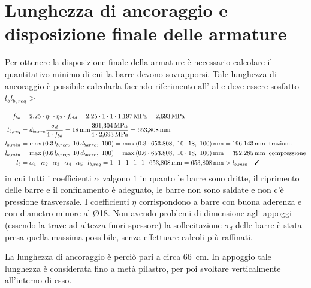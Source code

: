 \section{Lunghezza di ancoraggio e disposizione finale delle armature}
Per ottenere la disposizione finale della armature è necessario calcolare il quantitativo minimo di cui la barre devono sovrapporsi.
Tale lunghezza di ancoraggio è possibile calcolarla facendo riferimento all' al  e deve essere sosfatto $l_b l_{b,req}> $

\[
\begin{split}
f_{bd} 
&= 2.25 \cdot \eta_{1} \cdot \eta_{2} \cdot f_{ctd}  
= 2.25 \cdot 1 \cdot 1 \cdot \SI{1.197}{\mega\pascal} 
= \SI{2.693}{\mega\pascal}  
\\
l_{b,req} 
&= d_{barre} \frac{ \sigma_{d} }{ 4 \cdot f_{bd} }  
= \SI{18}{\milli\metre}  \frac{ \SI{391.304}{\mega\pascal} }{ 4 \cdot \SI{2.693}{\mega\pascal} } 
= \SI{653.808}{\milli\metre}  
\\
l_{b,min} 
&= 
\max { \left( 0.3 \, l_{b,req} ,\  10 \, d_{barre} ,\  100 \right) }  
= \max { \left( 0.3 \cdot 653.808 ,\  10 \cdot 18 ,\  100 \right) } \,\si{\milli\metre}
= \SI{196.143}{\milli\metre} \; \;\textrm{trazione}
\\
l_{b,min} 
&= \max { \left( 0.6 \, l_{b,req} ,\  10 \, d_{barre} ,\  100 \right) }  
= \max { \left( 0.6 \cdot 653.808 ,\  10 \cdot 18 ,\  100 \right) } \,\si{\milli\metre}
= \SI{392.285}{\milli\metre} \; \;\textrm{compressione}
\\
l_{b} 
&= \alpha_{1} \cdot \alpha_{2} \cdot \alpha_{3} \cdot \alpha_{4} \cdot \alpha_{5} \cdot l_{b,req}  
= 1 \cdot 1 \cdot 1 \cdot 1 \cdot 1 \cdot \SI{653.808}{\milli\metre} 
= \SI{653.808}{\milli\metre} > l_{b,min} \quad \checked
\end{split}
\]
in cui tutti i coefficienti $\alpha$ valgono $1$ in quanto le barre sono dritte, il riprimento delle barre e il confinamento è adeguato, le barre non sono saldate e non c'è pressione trasversale.
I coefficienti $\eta$ corrispondono a barre con buona aderenza e con diametro minore al Ø18.
Non avendo problemi di dimensione agli appoggi (essendo la trave ad altezza fuori spessore) la sollecitazione $\sigma_{d}$ delle barre è stata presa quella massima possibile, senza effettuare calcoli più raffinati.

La lunghezza di ancoraggio è perciò pari a circa \SI{66}{\centi\metre}.
In appoggio tale lunghezza è considerata fino a metà pilastro, per poi svoltare verticalmente all'interno di esso.

